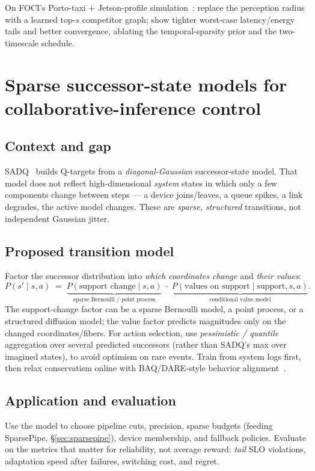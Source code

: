 \documentclass[11pt]{article}
\begin{document}
\begin{expbox}
On FOCI's Porto-taxi $+$ Jetson-profile simulation~\cite{foci}: replace the perception
radius with a learned top-$s$ competitor graph; show tighter worst-case latency/energy tails
and better convergence, ablating the temporal-sparsity prior and the two-timescale schedule.
\end{expbox}

\section{Sparse successor-state models for collaborative-inference control}
\label{sec:successor}

\subsection*{Context and gap}
SADQ~\cite{sadq} builds Q-targets from a \emph{diagonal-Gaussian} successor-state model.
That model does not reflect high-dimensional \emph{system} states in which only a few
components change between steps --- a device joins/leaves, a queue spikes, a link degrades,
the active model changes. These are \emph{sparse, structured} transitions, not
independent Gaussian jitter.

\subsection*{Proposed transition model}
Factor the successor distribution into \emph{which coordinates change} and \emph{their values}:
\[
P(s'\mid s,a)\;=\;\underbrace{P(\text{support change}\mid s,a)}_{\text{sparse Bernoulli / point process}}\;\cdot\;\underbrace{P(\text{values on support}\mid \text{support},s,a)}_{\text{conditional value model}} .
\]
The support-change factor can be a sparse Bernoulli model, a point process, or a structured
diffusion model; the value factor predicts magnitudes only on the changed coordinates/fibers.
For action selection, use \emph{pessimistic / quantile} aggregation over several predicted
successors (rather than SADQ's max over imagined states), to avoid optimism on rare events.
Train from system logs first, then relax conservatism online with BAQ/DARE-style behavior
alignment~\cite{baq,dare}.

\subsection*{Application and evaluation}
Use the model to choose pipeline cuts, precision, sparse budgets (feeding SparsePipe,
\S\ref{sec:sparsepipe}), device membership, and fallback policies. Evaluate on the metrics
that matter for reliability, not average reward: \emph{tail} SLO violations, adaptation
speed after failures, switching cost, and regret.
\end{document}

